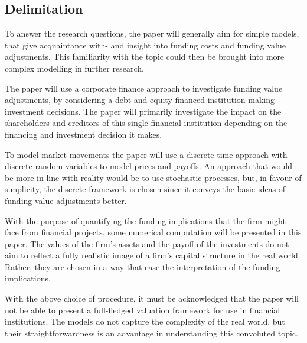 \documentclass[main.tex]{subfiles}
\begin{document}
    \subsection{Delimitation}

    To answer the research questions, the paper will generally aim for simple models,
    that give acquaintance with- and insight into funding costs and funding value adjustments.
    This familiarity with the topic could then be brought into more complex modelling
    in further research.

    The paper will use a corporate finance approach to investigate funding value adjustments,
    by considering a debt and equity financed institution making investment decisions.
    The paper will primarily investigate the impact on the shareholders and creditors 
    of this single financial institution depending on the financing and investment decision it makes.

    To model market movements the paper will use a discrete time approach 
    with discrete random variables to model prices and payoffs.
    An approach that would be more in line with reality would be to use stochastic processes,
    but, in favour of simplicity, the discrete framework is chosen 
    since it conveys the basic ideas of funding value adjustments better.

    With the purpose of quantifying the funding implications that the firm might face from financial projects,
    some numerical computation will be presented in this paper.
    The values of the firm's assets and the payoff of the investments
    do not aim to reflect a fully realistic image of a firm's capital structure in the real world.
    Rather, they are chosen in a way that ease the interpretation of the funding implications.

    With the above choice of procedure, it must be acknowledged that the paper will not be able to
    present a full-fledged valuation framework for use in financial institutions.
    The models do not capture the complexity of the real world,
    but their straightforwardness is an advantage in understanding this convoluted topic.
\end{document}
